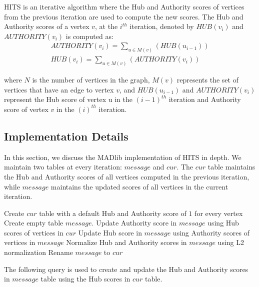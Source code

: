 HITS is an iterative algorithm where the Hub and Authority scores of vertices
from the previous iteration are used to compute the new scores. The
Hub and Authority scores of a vertex $v$, at the $i^{th}$ iteration, denoted by
$HUB(v_i)$ and $AUTHORITY(v_i)$ is computed as:
\begin{equation}
    \begin{aligned}
        AUTHORITY(v_i) = \sum_{u \in M(v)}({HUB(u_{i-1})})\\
        HUB(v_i) = \sum_{u \in M(v)}({AUTHORITY(v_{i})})
    \end{aligned}
\label{eq:hits}
\end{equation}

where $N$ is the number of vertices in the graph, $M(v)$ represents the set of
vertices that have an edge to vertex $v$, and $HUB(u_{i-1})$ and $AUTHORITY
(v_{i})$ represent the Hub score of vertex {u} in the $(i-1) ^{th}$ iteration and
Authority score of vertex $v$ in the $(i)^{th}$ iteration.

\subsection{Implementation Details} \label{sec:hits:implementation}

In this section, we discuss the MADlib implementation of HITS in depth.
We maintain two tables at every iteration: $message$ and $cur$. The
$cur$ table maintains the Hub and Authority scores of all vertices
computed in the previous iteration, while $message$ maintains the updated scores
of all vertices in the current iteration.

\begin{algorithm}[HITS$(V,E)$] \label{alg:hits:high}
\begin{algorithmic}[1]
	\State Create $cur$ table with a default Hub and Authority score of
			${1}$ for every vertex
	\Repeat
        \State Create empty table $message$.
        \State Update Authority score in $message$ using Hub scores of vertices
        in $cur$
        \State Update Hub score in $message$ using Authority scores of vertices
        in $message$
        \State Normalize Hub and Authority scores in $message$ using L2
        normalization
        \State Rename $message$ to $cur$
\end{algorithmic}
\end{algorithm}

The following query is used to create and update the Hub and Authority scores
in $message$ table using the Hub scores in $cur$ table.

